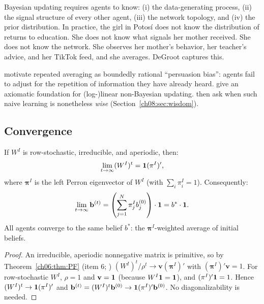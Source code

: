 \documentclass[../structural_economics_book.tex]{subfiles}
\begin{document}
\begin{intuition}
Bayesian updating requires agents to know: (i) the data-generating process, (ii) the signal structure of every other agent, (iii) the network topology, and (iv) the prior distribution. In practice, the girl in Potos\'{i} does not know the distribution of returns to education. She does not know what signals her mother received. She does not know the network. She observes her mother's behavior, her teacher's advice, and her TikTok feed, and she averages. DeGroot captures this.

\citet{demarzo2003persuasion} motivate repeated averaging as boundedly rational ``persuasion bias'': agents fail to adjust for the repetition of information they have already heard. \citet{molavi2018theory} give an axiomatic foundation for (log-)linear non-Bayesian updating. \citet{golub2010naive} then ask when such naive learning is nonetheless \textit{wise} (Section~\ref{ch08:sec:wisdom}).
\end{intuition}


\subsection{Convergence}

\begin{theorem}\label{ch08:thm:degroot}
If $W^I$ is row-stochastic, irreducible, and aperiodic, then:
\begin{equation}\label{ch08:eq:convergence}
\lim_{t \to \infty} (W^I)^t = \mathbf{1} (\pi^I)',
\end{equation}
where $\boldsymbol{\pi}^I$ is the left Perron eigenvector of $W^I$ (with $\sum_i \pi^I_i = 1$). Consequently:
\begin{equation}\label{ch08:eq:consensus}
\lim_{t \to \infty} \mathbf{b}^{(t)} = \left(\sum_{j=1}^N \pi^I_j b_j^{(0)}\right) \cdot \mathbf{1} = b^* \cdot \mathbf{1}.
\end{equation}
All agents converge to the same belief $b^*$: the $\boldsymbol{\pi}^I$-weighted average of initial beliefs.
\end{theorem}

\begin{proof}
An irreducible, aperiodic nonnegative matrix is primitive, so by Theorem~\ref{ch06:thm:PF} (item 6; \citealp[Thm.~1.2]{seneta2006nonnegative}) $(W^I)^t/\rho^t \to \mathbf{v}(\boldsymbol{\pi}^I)'$ with $(\boldsymbol{\pi}^I)'\mathbf{v} = 1$. For row-stochastic $W^I$, $\rho = 1$ and $\mathbf{v} = \mathbf{1}$ (because $W^I\mathbf{1} = \mathbf{1}$), and $(\pi^I)'\mathbf{1} = 1$. Hence $(W^I)^t \to \mathbf{1}(\pi^I)'$ and $\mathbf{b}^{(t)} = (W^I)^t\mathbf{b}^{(0)} \to \mathbf{1}(\pi^I)'\mathbf{b}^{(0)}$. No diagonalizability is needed.
\end{proof}
\end{document}
